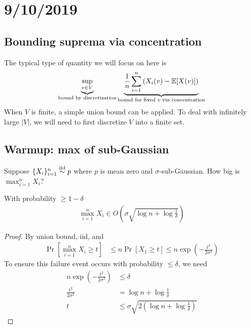\section{9/10/2019}

\subsection{Bounding suprema via concentration}

The typical type of quantity we will focus on here is
\begin{align}
    \underbrace{\sup_{v \in V}}_{\text{bound by discretization}}
    \underbrace{\frac{1}{n} \sum_{i=1}^n \left(X_i(v) - \mathbb{E}[X(v)] \right)}_{\text{bound for fixed $v$ via concentration}}\label{eq:typical-sup-via-concentration}
\end{align}
When $V$ is finite, a simple union bound can be applied.
To deal with infinitely large $\lvert V \rvert$, we will need to first discretize $V$ into
a finite set.

\subsection{Warmup: max of sub-Gaussian}

Suppose $\{X_i\}_{i=1}^n \overset{\text{iid}}{\sim} p$ where $p$ is mean zero and $\sigma$-sub-Gaussian.
How big is $\max_{i=1}^n X_i$?

\begin{lemma}\label{lem:concentration-max-sub-gaussian}
    With probability $\geq 1 - \delta$
    \begin{align}
        \max_{i=1}^n X_i \in O\left(\sigma \sqrt{\log n + \log \frac{1}{\delta}} \right)
    \end{align}
\end{lemma}

\begin{proof}
    By union bound, iid, and 
    \begin{align}
        \Pr\left[\max_{i=1}^n X_i \geq t \right]
        &\leq n \Pr[X_1 \geq t]
        \leq n \exp\left(-\frac{t^2}{2 \sigma^2}\right)
    \end{align}
    To ensure this failure event occurs with probability $\leq \delta$, we need
    \begin{align}
        n \exp\left(-\frac{t^2}{2 \sigma^2}\right) &\leq \delta \\
        \frac{t^2}{2 \sigma^2} &= \log n + \log \frac{1}{\delta} \\
        t &\leq \sigma \sqrt{2\left(\log n + \log \frac{1}{\delta} \right)}
    \end{align}
\end{proof}

